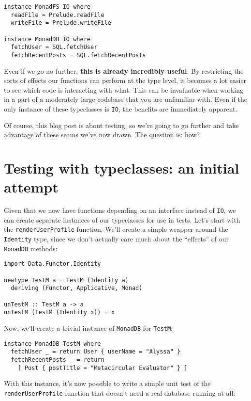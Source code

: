 \begin{verbatim}
instance MonadFS IO where
  readFile = Prelude.readFile
  writeFile = Prelude.writeFile

instance MonadDB IO where
  fetchUser = SQL.fetchUser
  fetchRecentPosts = SQL.fetchRecentPosts
\end{verbatim}
Even if we go no further, \textbf{this is already incredibly useful}. By
restricting the sorts of effects our functions can perform at the type
level, it becomes a lot easier to see which code is interacting with
what. This can be invaluable when working in a part of a moderately
large codebase that you are unfamiliar with. Even if the only instance
of these typeclasses is \texttt{IO}, the benefits are immediately
apparent.

Of course, this blog post is about testing, so we're going to go further
and take advantage of these seams we've now drawn. The question is: how?

\section{Testing with typeclasses: an initial
attempt}\label{testing-with-typeclasses-an-initial-attempt}

Given that we now have functions depending on an interface instead of
\texttt{IO}, we can create separate instances of our typeclasses for use
in tests. Let's start with the \texttt{renderUserProfile} function.
We'll create a simple wrapper around the \texttt{Identity} type, since
we don't actually care much about the ``effects'' of our
\texttt{MonadDB} methods:

\begin{verbatim}
import Data.Functor.Identity

newtype TestM a = TestM (Identity a)
  deriving (Functor, Applicative, Monad)

unTestM :: TestM a -> a
unTestM (TestM (Identity x)) = x
\end{verbatim}
Now, we'll create a trivial instance of \texttt{MonadDB} for
\texttt{TestM}:

\begin{verbatim}
instance MonadDB TestM where
  fetchUser _ = return User { userName = "Alyssa" }
  fetchRecentPosts _ = return
    [ Post { postTitle = "Metacircular Evaluator" } ]
\end{verbatim}
With this instance, it's now possible to write a simple unit test of the
\texttt{renderUserProfile} function that doesn't need a real database
running at all:

